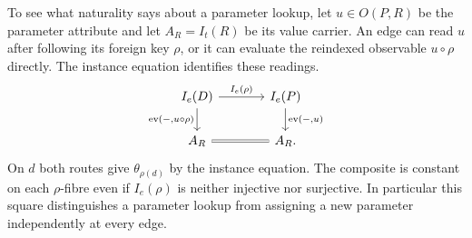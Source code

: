 \documentclass[11pt,a4paper]{article}
\theoremstyle{definition}
\theoremstyle{remark}\newaliascnt{remark}{theorem}
\newcommand{\ev}{\operatorname{ev}}
\numberwithin{equation}{section}
\begin{document}
To see what naturality says about a parameter lookup, let $u\in O(P,R)$ be the parameter attribute and let $A_R=I_t(R)$ be its value carrier. An edge can read $u$ after following its foreign key $\rho$, or it can evaluate the reindexed observable $u\circ\rho$ directly. The instance equation identifies these readings.
\[
\begin{tikzcd}[column sep=large]
 I_e(D)\arrow[r,"I_e(\rho)"]\arrow[d,"{\ev(-,u\circ\rho)}"']&
 I_e(P)\arrow[d,"{\ev(-,u)}"]\\
 A_R\arrow[r,equal]&A_R .
\end{tikzcd}
\]
On \(d\) both routes give \(\theta_{\rho(d)}\) by the instance equation. The composite is constant on each \(\rho\)-fibre even if \(I_e(\rho)\) is neither injective nor surjective. In particular this square distinguishes a parameter lookup from assigning a new parameter independently at every edge.
\end{document}
